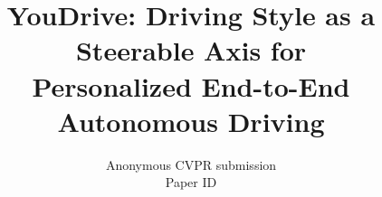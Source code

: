 \documentclass[10pt,twocolumn,letterpaper]{article}
\title{YouDrive: Driving Style as a Steerable Axis for\\
Personalized End-to-End Autonomous Driving}
\author{Anonymous CVPR submission\\
Paper ID \paperID}
\begin{document}
\maketitle







{
    \small
    
    
}


\end{document}
